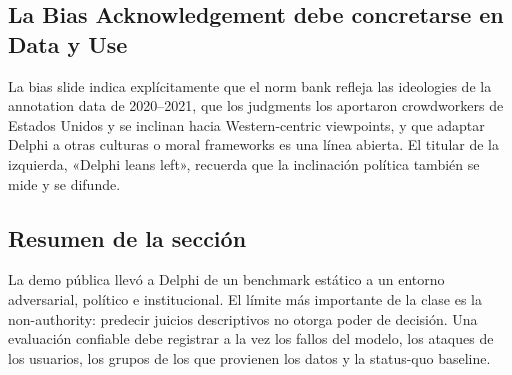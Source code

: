 \subsection{La Bias Acknowledgement debe concretarse en Data y Use}

La bias slide indica explícitamente que el norm bank refleja las ideologies de la annotation data de 2020--2021, que los judgments los aportaron crowdworkers de Estados Unidos y se inclinan hacia Western-centric viewpoints, y que adaptar Delphi a otras culturas o moral frameworks es una línea abierta. El titular de la izquierda, «Delphi leans left», recuerda que la inclinación política también se mide y se difunde.



\subsection{Resumen de la sección}

La demo pública llevó a Delphi de un benchmark estático a un entorno adversarial, político e institucional. El límite más importante de la clase es la non-authority: predecir juicios descriptivos no otorga poder de decisión. Una evaluación confiable debe registrar a la vez los fallos del modelo, los ataques de los usuarios, los grupos de los que provienen los datos y la status-quo baseline.
